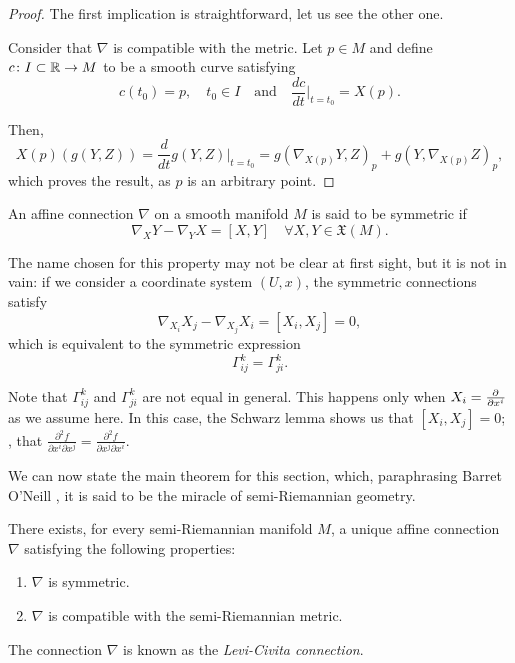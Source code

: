 \begin{proof}
	The first implication is straightforward, let us see the other one.

	Consider that $\nabla$ is compatible with the metric. Let $p \in M$ and define $c \colon I \subset \mathbb{R} \to M$ to be a smooth curve satisfying
	\[
		c(t_0) = p, \quad t_0 \in I \quad \textrm{and} \quad \frac{dc}{dt} \Bigr|_{t = t_0} = X(p).
	\]
	
	Then,
	\[
		X(p)\left(g(Y,Z)\right) = \frac{d}{dt}g(Y,Z)\Bigr|_{t=t_0} = g(\nabla_{X(p)} Y, Z)_p + g(Y, \nabla_{X(p)} Z)_p,
	\]
	which proves the result, as $p$ is an arbitrary point.
\end{proof}

\begin{definition}
	An affine connection $\nabla$ on a smooth manifold $M$ is said to be symmetric if
	\[
		\nabla_X Y - \nabla_Y X = [X, Y] \quad \forall X,Y \in \mathfrak{X}(M).
	\]
\end{definition}

The name chosen for this property may not be clear at first sight, but it is not in vain: if we consider a coordinate system $(U,x)$, the symmetric connections satisfy
\[
	\nabla_{X_i} X_j - \nabla_{X_j} X_i = [X_i, X_j] = 0,
\]
which is equivalent to the symmetric expression
\[
	\Gamma^k_{ij} = \Gamma^k_{ji}.
\]

Note that $\Gamma^k_{ij}$ and $\Gamma^k_{ji}$ are not equal in general. This happens only when $X_i = \frac{\partial^{} }{\partial x^i}$ as we assume here. In this case, the Schwarz lemma shows us that $[X_i, X_j] = 0$; \ie, that $\frac{\partial^2 f}{\partial x^i \partial x^j} = \frac{\partial^2 f}{\partial x^j \partial x^i}$.

We can now state the main theorem for this section, which, paraphrasing Barret O'Neill \cite[p. 60]{oneill83}, it is said to be the miracle of semi-Riemannian geometry.

\begin{theorem}
	\label{theo:levicivita}
	There exists, for every semi-Riemannian manifold $M$, a unique affine connection $\nabla$ satisfying the following properties:
	\begin{enumerate}
		\item $\nabla$ is symmetric.
		\item $\nabla$ is compatible with the semi-Riemannian metric.
	\end{enumerate}

	The connection $\nabla$ is known as the \emph{Levi-Civita connection}.
\end{theorem}

